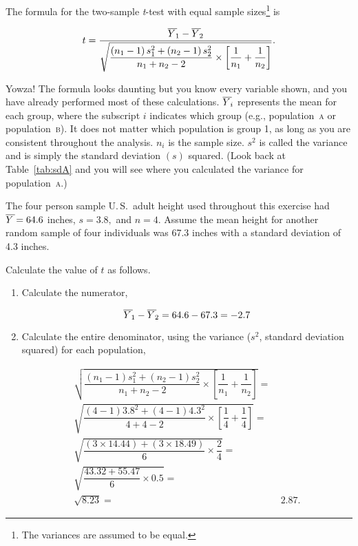 \documentclass[12pt]{exam}
\newcommand*\meanY{\overline{Y\kern1.67pt}\kern-1.67pt}
\newcommand*\ttest{\emph{t}-test}
\newcommand*\popa{population~\textsc{a}} %
\newcommand*\popb{population~\textsc{b}} %
\begin{document}
\begin{questions}
The formula for the two-sample \ttest{} with equal sample sizes\footnote{The variances are assumed to be equal.} is


\begin{equation*}
t = \dfrac{\meanY_1 - \meanY_2}{\sqrt{\dfrac{\left(n_1 - 1\right)s_1^2 + \left(n_2 - 1\right)s_2^2}{n_1 + n_2 -2} \times \left[\dfrac{1}{n_1} + \dfrac{1}{n_2}\right]}}.
\end{equation*}

Yowza! The formula looks daunting but you know every variable shown, and you have already performed most of these calculations. $\meanY_{i}$ represents the mean for each group, where the subscript $i$ indicates which group (e.g., \popa{} or \popb{}). It does not matter which population is group 1, as long as you are consistent throughout the analysis. $n_i$ is the sample size. $s^2$ is called the variance and is simply the standard deviation $\left(s\right)$ squared. (Look back at Table~\ref{tab:sdA} and you will see where you calculated the variance for \popa{}.) 

The four person sample U.\,S.\ adult height used throughout this exercise had $\meanY = 64.6$ inches, $s = 3.8,$ and $n = 4.$ Assume the mean height for another random sample of four individuals was 67.3 inches with a standard deviation of 4.3 inches.

Calculate the value of $t$ as follows.

\begin{enumerate}

\item Calculate the numerator,

\begin{equation*}
\meanY_1 - \meanY_2 = 64.6 - 67.3 = -2.7
\end{equation*}

\item Calculate the entire denominator, using the variance ($s^2$, standard deviation squared) for each population,

\begin{equation*}
	\begin{split}
		\sqrt{\dfrac{\left(n_1 - 1\right)s_1^2 + \left(n_2 - 1\right)s_2^2}{n_1 + n_2 -2} \times \left[\dfrac{1}{n_1} + \dfrac{1}{n_2}\right]} = & \\
%
		\sqrt{\dfrac{\left(4 - 1\right)3.8^2 + \left(4 - 1\right)4.3^2}{4 + 4 - 2} \times \left[\dfrac{1}{4} + \dfrac{1}{4}\right]} = & \\
%
		\sqrt{\dfrac{\left(3 \times 14.44\right) + \left(3 \times18.49 \right)}{6} \times \dfrac{2}{4}} = & \\
%
		\sqrt{\dfrac{43.32 + 55.47}{6} \times 0.5} = & \\
		\sqrt{8.23} = &\ 2.87.
	\end{split}
\end{equation*}


\end{enumerate}
\end{questions}
\end{document}
